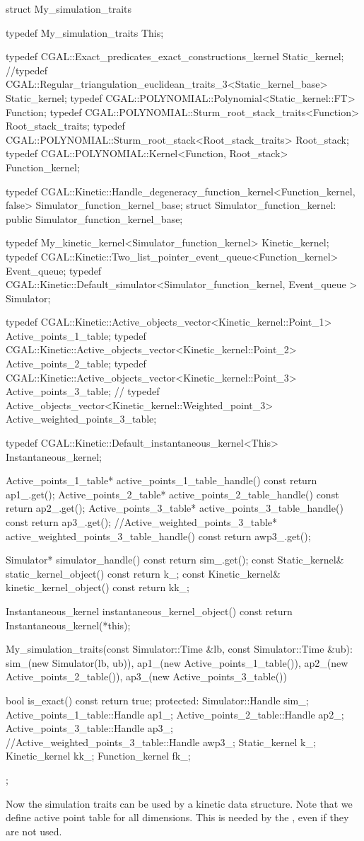 \begin{ccExampleCode}
struct My_simulation_traits {
  typedef My_simulation_traits This;

  typedef CGAL::Exact_predicates_exact_constructions_kernel Static_kernel;
  //typedef CGAL::Regular_triangulation_euclidean_traits_3<Static_kernel_base> Static_kernel;
  typedef CGAL::POLYNOMIAL::Polynomial<Static_kernel::FT> Function;
  typedef CGAL::POLYNOMIAL::Sturm_root_stack_traits<Function> Root_stack_traits;
  typedef CGAL::POLYNOMIAL::Sturm_root_stack<Root_stack_traits> Root_stack;
  typedef CGAL::POLYNOMIAL::Kernel<Function, Root_stack> Function_kernel;

  typedef CGAL::Kinetic::Handle_degeneracy_function_kernel<Function_kernel, false>  Simulator_function_kernel_base;
  struct Simulator_function_kernel: public Simulator_function_kernel_base{};

  typedef My_kinetic_kernel<Simulator_function_kernel> Kinetic_kernel;
  typedef CGAL::Kinetic::Two_list_pointer_event_queue<Function_kernel> Event_queue;
  typedef CGAL::Kinetic::Default_simulator<Simulator_function_kernel, Event_queue > Simulator;

  typedef CGAL::Kinetic::Active_objects_vector<Kinetic_kernel::Point_1> Active_points_1_table;
  typedef CGAL::Kinetic::Active_objects_vector<Kinetic_kernel::Point_2> Active_points_2_table;
  typedef CGAL::Kinetic::Active_objects_vector<Kinetic_kernel::Point_3> Active_points_3_table;
  // typedef Active_objects_vector<Kinetic_kernel::Weighted_point_3> Active_weighted_points_3_table;
 
  typedef CGAL::Kinetic::Default_instantaneous_kernel<This> Instantaneous_kernel;

  Active_points_1_table* active_points_1_table_handle() const { return ap1_.get();}
  Active_points_2_table* active_points_2_table_handle() const {return ap2_.get();}
  Active_points_3_table* active_points_3_table_handle() const {return ap3_.get();}
  //Active_weighted_points_3_table* active_weighted_points_3_table_handle() const {return awp3_.get();}

  Simulator* simulator_handle() const { return sim_.get();}
  const Static_kernel& static_kernel_object() const {return k_;}
  const Kinetic_kernel& kinetic_kernel_object() const {return kk_;}
 
  Instantaneous_kernel instantaneous_kernel_object() const {
    return Instantaneous_kernel(*this);
  }

  My_simulation_traits(const Simulator::Time &lb,
		       const Simulator::Time &ub): sim_(new Simulator(lb, ub)),
						   ap1_(new Active_points_1_table()),
						   ap2_(new Active_points_2_table()),
						   ap3_(new Active_points_3_table())
  {}
 
  
  bool is_exact() const {
    return true;
  }
protected:
  Simulator::Handle sim_;
  Active_points_1_table::Handle ap1_;
  Active_points_2_table::Handle ap2_;
  Active_points_3_table::Handle ap3_;
  //Active_weighted_points_3_table::Handle awp3_;
  Static_kernel k_;
  Kinetic_kernel kk_;
  Function_kernel fk_;
};

\end{ccExampleCode}

Now the simulation traits can be used by a kinetic data structure.
Note that we define active point table for all dimensions. This is
needed by the , even if they are not
used.

